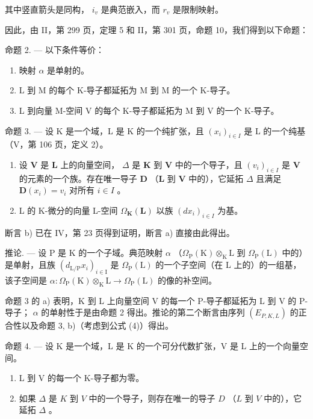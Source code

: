 其中竖直箭头是同构， \(i_{v}\) 是典范嵌入，而 \(r_{v}\) 是限制映射。

因此，由 II，第 299 页，定理 5 和 II，第 301 页，命题 10，我们得到以下命题：

命题 2. --- 以下条件等价：

\begin{enumerate}
\def\labelenumi{\alph{enumi})}
\item
  映射 \(\alpha\) 是单射的。
\item
  L 到 M 的每个 K-导子都延拓为 M 到 M 的一个 K-导子。
\item
  L 到向量 M-空间 V 的每个 K-导子都延拓为 M 到 V 的一个 K-导子。
\end{enumerate}

命题 3. --- 设 K 是一个域，L 是 K 的一个纯扩张，且 \((x_{i})_{i\in I}\) 是 L 的一个纯基（V，第 106 页，定义 2）。

\begin{enumerate}
\def\labelenumi{\alph{enumi})}
\item
  设 \(\mathbf{V}\) 是 \(\mathbf{L}\) 上的向量空间， \(\Delta\) 是 \(\mathbf{K}\) 到 \(\mathbf{V}\) 中的一个导子，且 \((v_i)_{i\in I}\) 是 \(\mathbf{V}\) 的元素的一个族。存在唯一导子 \(\mathbf{D}\) （\(\mathbf{L}\) 到 \(\mathbf{V}\) 中的），它延拓 \(\Delta\) 且满足 \(\mathbf{D}(x_i) = v_i\) 对所有 \(i\in I\) 。
\item
  L 的 K-微分的向量 L-空间 \(\Omega_{\mathbf{K}}(\mathbf{L})\) 以族 \((dx_i)_{i\in I}\) 为基。
\end{enumerate}

断言 b) 已在 IV，第 23 页得到证明，断言 a) 直接由此得出。

推论. --- 设 P 是 K 的一个子域。典范映射 \(\alpha\) （\(\Omega_{\mathrm{P}}(\mathrm{K}) \otimes_{\mathrm{K}} \mathrm{L}\) 到 \(\Omega_{\mathrm{P}}(\mathrm{L})\) 中的）是单射，且族 \((d_{\mathrm{L}/\mathrm{P}}x_{i})_{i \in \mathrm{I}}\) 是 \(\Omega_{\mathrm{P}}(\mathrm{L})\) 的一个子空间（在 L 上的）的一组基，该子空间是 \(\alpha: \Omega_{\mathrm{P}}(\mathrm{K}) \otimes_{\mathrm{K}} \mathrm{L} \to \Omega_{\mathrm{P}}(\mathrm{L})\) 的像的补空间。

命题 3 的 a) 表明，K 到 L 上向量空间 V 的每一个 P-导子都延拓为 L 到 V 的 P-导子； \(\alpha\) 的单射性于是由命题 2 得出。推论的第二个断言由序列 \((E_{P,K,L})\) 的正合性以及命题 3, b)（考虑到公式 (4)）得出。

命题 4. --- 设 K 是一个域，L 是 K 的一个可分代数扩张，V 是 L 上的一个向量空间。

\begin{enumerate}
\def\labelenumi{\alph{enumi})}
\item
  L 到 V 的每一个 K-导子都为零。
\item
  如果 \(\Delta\) 是 \(K\) 到 \(V\) 中的一个导子，则存在唯一的导子 \(D\) （\(L\) 到 \(V\) 中的），它延拓 \(\Delta\) 。
\end{enumerate}

